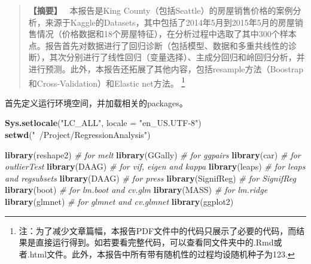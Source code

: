 \documentclass[]{article}
\newenvironment{Shaded}{\begin{snugshade}}{\end{snugshade}}
\newcommand{\KeywordTok}[1]{\textcolor[rgb]{0.13,0.29,0.53}{\textbf{#1}}}
\newcommand{\DataTypeTok}[1]{\textcolor[rgb]{0.13,0.29,0.53}{#1}}
\newcommand{\StringTok}[1]{\textcolor[rgb]{0.31,0.60,0.02}{#1}}
\newcommand{\CommentTok}[1]{\textcolor[rgb]{0.56,0.35,0.01}{\textit{#1}}}
\newcommand{\NormalTok}[1]{#1}
\let\rmarkdownfootnote\footnote%
\def\footnote{\protect\rmarkdownfootnote}
\begin{document}
\thispagestyle{empty}


%


\maketitle

\begin{abstract} 
{\large
\textbf{【摘要】\ }  本报告是King County（包括Seattle）的房屋销售价格的案例分析，来源于Kaggle的Datasets，其中包括了2014年5月到2015年5月的房屋销售情况（价格数据和18个房屋特征），在分析过程中选取了其中300个样本点。报告首先对数据进行了回归诊断（包括模型、数据和多重共线性的诊断），其次分别进行了线性回归（变量选择）、主成分回归和岭回归分析，并进行预测。此外，本报告还拓展了其他内容，包括resample方法（Boostrap和Cross-Validation）和Elastic net方法。
\footnote{注：为了减少文章篇幅，本报告PDF文件中的代码只展示了必要的代码，而结果是直接运行得到。如若要看完整代码，可以查看同文件夹中的.Rmd或者.html文件。此外，本报告中所有带有随机性的过程均设随机种子为123.}
}
\end{abstract}


\setcounter{page}{0}
\thispagestyle{empty}



\newpage
\tableofcontents
\newpage



%

首先定义运行环境空间，并加载相关的packages。
\begin{Shaded}
\begin{Highlighting}[]
\KeywordTok{Sys.setlocale}\NormalTok{(}\StringTok{"LC_ALL"}\NormalTok{, }\DataTypeTok{locale =} \StringTok{"en_US.UTF-8"}\NormalTok{)}
\KeywordTok{setwd}\NormalTok{(}\StringTok{"~/Project/RegressionAnalysis"}\NormalTok{)}

\KeywordTok{library}\NormalTok{(reshape2)  }\CommentTok{# for melt}
\KeywordTok{library}\NormalTok{(GGally)  }\CommentTok{# for ggpairs}
\KeywordTok{library}\NormalTok{(car)  }\CommentTok{# for outlierTest}
\KeywordTok{library}\NormalTok{(DAAG)  }\CommentTok{# for vif, eigen and kappa}
\KeywordTok{library}\NormalTok{(leaps)  }\CommentTok{# for leaps and regsubsets}
\KeywordTok{library}\NormalTok{(DAAG)  }\CommentTok{# for press}
\KeywordTok{library}\NormalTok{(SignifReg)  }\CommentTok{# for SignifReg}
\KeywordTok{library}\NormalTok{(boot)  }\CommentTok{# for lm.boot and cv.glm}
\KeywordTok{library}\NormalTok{(MASS)  }\CommentTok{# for lm.ridge}
\KeywordTok{library}\NormalTok{(glmnet) }\CommentTok{# for glmnet and cv.glmnet}
\KeywordTok{library}\NormalTok{(ggplot2)}
\end{Highlighting}
\end{Shaded}
\end{document}
